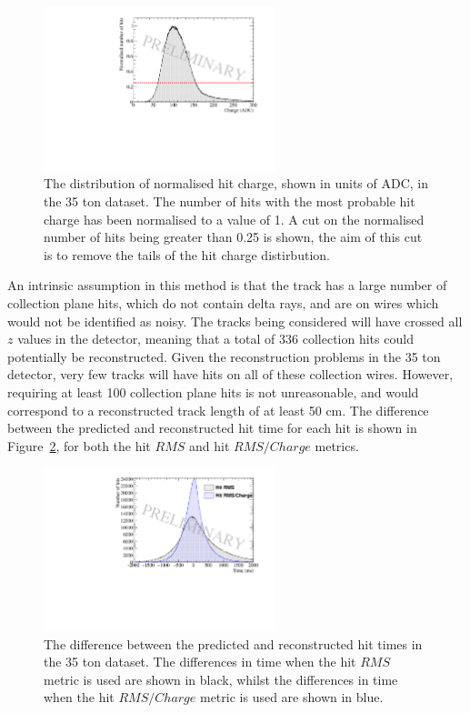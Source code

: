 \begin{figure}[h!]
  \centering
  \includegraphics[width=0.6\textwidth]{ChargeCutData}
  \caption[The distribution of normalised hit charge in the 35 ton dataset]
          {The distribution of normalised hit charge, shown in units of ADC, in the 35 ton dataset. The number of hits with the most probable hit charge has been normalised to a value of 1. A cut on the normalised number of hits being greater than 0.25 is shown, the aim of this cut is to remove the tails of the hit charge distirbution.}
  \label{fig:DiffData_ChargeCut}
\end{figure}

An intrinsic assumption in this method is that the track has a large number of collection plane hits, which do not contain delta rays, and are on wires which would not be identified as noisy. The tracks being considered will have crossed all $z$ values in the detector, meaning that a total of 336 collection hits could potentially be reconstructed. Given the reconstruction problems in the 35 ton detector, very few tracks will have hits on all of these collection wires. However, requiring at least 100 collection plane hits is not unreasonable, and would correspond to a reconstructed track length of at least 50 cm. The difference between the predicted and reconstructed hit time for each hit is shown in Figure~\ref{fig:DiffDataPredHit}, for both the hit $RMS$ and hit $RMS/Charge$ metrics. \\

\begin{figure}[h!]
  \centering
  \includegraphics[width=0.6\textwidth]{DifferenceInteractionTime_Data}
  \caption[The difference between the predicted and reconstructed hit times in the 35 ton dataset]
          {The difference between the predicted and reconstructed hit times in the 35 ton dataset. The differences in time when the hit $RMS$ metric is used are shown in black, whilst the differences in time when the hit $RMS/Charge$ metric is used are shown in blue.}
  \label{fig:DiffDataPredHit}
\end{figure}

